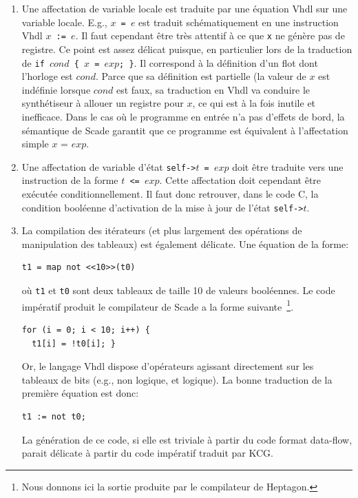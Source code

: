 \documentclass[a4paper]{article}
\newcommand{\scade}{{\sc Scade}}
\newcommand{\heptagon}{{\sc Heptagon}}
\newcommand{\vhdl}{{\sc Vhdl}}
\begin{document}
\begin{enumerate}
\item Une affectation de variable locale est traduite par une équation
  \vhdl{} sur une variable locale. E.g., \texttt{$x$ = $e$} est traduit
  schématiquement en une instruction \vhdl{} \texttt{$x$ := $e$}.  Il faut
  cependant être très attentif à ce que \verb-x- ne génère pas de
  registre.  Ce point est assez délicat puisque, en particulier lors
  de la traduction de \texttt{if $cond$ \{ $x$ = $exp$; \}}. Il
  correspond à la définition d'un flot dont l'horloge est
  $cond$. Parce que sa définition est partielle (la valeur de $x$ est
  indéfinie lorsque $cond$ est faux, sa traduction en \vhdl{} va conduire
  le synthétiseur à allouer un registre pour $x$, ce qui est à la fois
  inutile et inefficace.  Dans le cas où le programme en entrée n'a
  pas d'effets de bord, la sémantique de \scade{} garantit que ce
  programme est équivalent à l'affectation simple $x$ = $exp$.
\item Une affectation de variable d'état \texttt{self->$t$ =
    $exp$} doit être traduite vers une instruction de la forme
  \texttt{$t$ <= $exp$}. Cette affectation doit cependant être exécutée
  conditionnellement. Il faut donc retrouver, dans le code C,
  la condition booléenne d'activation de la mise à jour de
  l'état \texttt{self->$t$}.
\item La compilation des itérateurs (et plus largement des opérations de
manipulation des tableaux) est également délicate. Une équation de la forme:
\begin{verbatim}
t1 = map not <<10>>(t0)
\end{verbatim}
où \verb-t1- et \verb-t0- sont deux tableaux de taille 10 de valeurs
booléennes. Le code impératif produit le compilateur de \scade{} a
la forme suivante~\footnote{Nous donnons ici la sortie produite par le
  compilateur de \heptagon.}.
\begin{verbatim}
for (i = 0; i < 10; i++) {
  t1[i] = !t0[i]; }
\end{verbatim}
Or, le langage \vhdl{} dispose d'opérateurs agissant directement sur les
tableaux de bits (e.g., non logique, et logique). La bonne traduction
de la première équation est donc:
\begin{verbatim}
t1 := not t0;
\end{verbatim}
La génération de ce code, si elle est triviale à partir du code format data-flow,
parait délicate à partir du code impératif traduit par KCG.
\end{enumerate}
\end{document}
